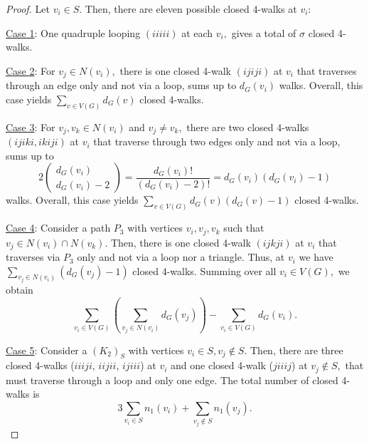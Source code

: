 \documentclass[12pt,a4paper,reqno]{amsart}
\numberwithin{equation}{section}
\theoremstyle{plain}
\theoremstyle{definition}
\newcommand{\<}{\langle}
\renewcommand{\>}{\rangle}
\begin{document}
\begin{proof}

Let $v_i \in S.$ Then, there are eleven possible closed 4-walks at $v_i:$


\underline{Case 1}: 
One quadruple looping $(iiiii)$ at each $v_i,$ gives a total of $\sigma$ closed 4-walks. 
\vspace{0.5em}

\underline{Case 2}: 
For $v_j \in N(v_i),$ there is one closed 4-walk $(ijiji)$ at $v_i$ that traverses through an edge only and not via a loop, sums up to $d_G(v_i)$ walks. Overall, this case yields
$
\sum_{v \in V(G)} d_G(v)
$
closed 4-walks.
\vspace{1em}

\underline{Case 3}:
For $v_j,v_k \in N(v_i)$ and $v_j \neq v_k,$ there are two closed 4-walks $(ijiki, ikiji)$ at $v_i$ that traverse through two edges only and not via a loop, sums up to 
\[
2\begin{pmatrix} d_G(v_i) \\ d_G(v_i)-2 \end{pmatrix} = \frac{d_G(v_i)!}{(d_G(v_i)-2)!} = d_G(v_i) (d_G(v_i)-1)
\]
walks. Overall, this case yields 
$
\sum_{v \in V(G)} d_G(v)(d_G(v)-1)
$
closed 4-walks.
\vspace{1em}

\underline{Case 4}:
Consider a path $P_3$ with vertices $v_i,v_j,v_k$ such that $v_j \in N(v_i) \cap N(v_k)$. Then, there is one closed 4-walk $(ijkji)$ at $v_i$ that traverses via $P_3$ only and not via a loop nor a triangle. Thus, at $v_i$ we have 
$
\sum_{v_j \in N(v_i)} (d_G(v_j)-1) %
$
closed 4-walks.  
Summing over all $v_i \in V(G),$ we obtain
\[
\sum_{v_i \in V(G)}\left( \sum_{v_j \in N(v_i)}  d_G(v_j) \right) - \sum_{v_i \in V(G)}d_G(v_i) .
\]
\vspace{0.2em}

\underline{Case 5}:
Consider a $(K_2)_S$ with vertices $v_i \in S, v_j\notin S$. Then, there are three closed 4-walks ($iiiji$, $iijii$, $ijiii$) at $v_i$ and one closed 4-walk ($jiiij$) at $v_j \notin S,$ that must traverse through a loop and only one edge. The total number of closed 4-walks is 
\[
3 \sum_{v_i \in S} n_1(v_i) + \sum_{v_j \notin S} n_1(v_j).  
\] 
\vspace{0.2em}


\end{proof}
\end{document}

